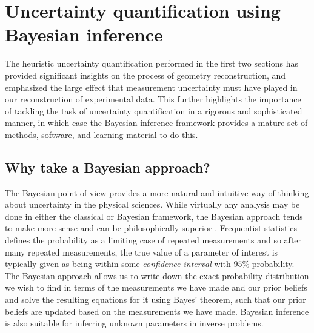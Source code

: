 %
%

\section{Uncertainty quantification using Bayesian inference} \label{sec:uncertaintyBayesian}
The heuristic uncertainty quantification performed in the first two sections has provided significant insights on the process of geometry reconstruction, and emphasized the large effect that measurement uncertainty must have played in our reconstruction of experimental data. This further highlights the importance of tackling the task of uncertainty quantification in a rigorous and sophisticated manner, in which case the Bayesian inference framework provides a mature set of methods, software, and learning material to do this.

\subsection{Why take a Bayesian approach?}
The Bayesian point of view provides a more natural and intuitive way of thinking about uncertainty in the physical sciences. While virtually any analysis may be done in either the classical or Bayesian framework, the Bayesian approach tends to make more sense and can be philosophically superior \citep{Gelman13}. Frequentist statistics defines the probability as a limiting case of repeated measurements and so after many repeated measurements, the true value of a parameter of interest is typically given as being within some \emph{confidence interval} with $95\%$ probability. The Bayesian approach allows us to write down the exact probability distribution we wish to find in terms of the measurements we have made and our prior beliefs and solve the resulting equations for it using Bayes' theorem, such that our prior beliefs are updated based on the measurements we have made. Bayesian inference is also suitable for inferring unknown parameters in inverse problems.

